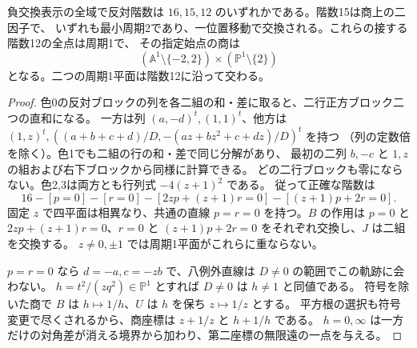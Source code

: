 \begin{corollary}\label{cor:negative-exchange-opposite-ranks}
負交換表示の全域で反対階数は $16,15,12$ のいずれかである。階数15は商上の二因子で、
いずれも最小周期2であり、一位置移動で交換される。これらの接する階数12の全点は周期1で、
その指定始点の商は
\[
 (\mathbb A^1\setminus\{-2,2\})\times(\mathbb P^1\setminus\{2\})
\]
となる。二つの周期1平面は階数12に沿って交わる。
\end{corollary}
\begin{proof}
色0の反対ブロックの列を各二組の和・差に取ると、二行正方ブロック二つの直和になる。
一方は列 $(a,-d)^t,(1,1)^t$、他方は $(1,z)^t,((a+b+c+d)/D,-(az+bz^2+c+dz)/D)^t$ を持つ
（列の定数倍を除く）。色1でも二組の行の和・差で同じ分解があり、
最初の二列 $b,-c$ と $1,z$ の組および右下ブロックから同様に計算できる。
どの二行ブロックも零にならない。色2,3は両方とも行列式 $-4(z+1)^2$ である。
従って正確な階数は
\[
16-[p=0]-[r=0]-[2zp+(z+1)r=0]-[(z+1)p+2r=0].
\]
固定 $z$ で四平面は相異なり、共通の直線 $p=r=0$ を持つ。$B$ の作用は
$p=0$ と $2zp+(z+1)r=0$、$r=0$ と $(z+1)p+2r=0$ をそれぞれ交換し、$J$ は二組を交換する。
$z\ne0,\pm1$ では周期1平面がこれらに重ならない。

$p=r=0$ なら $d=-a,c=-zb$ で、八例外直線は $D\ne0$ の範囲でこの軌跡に会わない。
$h=t^2/(zq^2)\in\mathbb P^1$ とすれば $D\ne0$ は $h\ne1$ と同値である。
符号を除いた商で $B$ は $h\mapsto1/h$、$U$ は $h$ を保ち $z\mapsto1/z$ とする。
平方根の選択も符号変更で尽くされるから、商座標は $z+1/z$ と $h+1/h$ である。
$h=0,\infty$ は一方だけの対角差が消える境界から加わり、第二座標の無限遠の一点を与える。
\end{proof}
